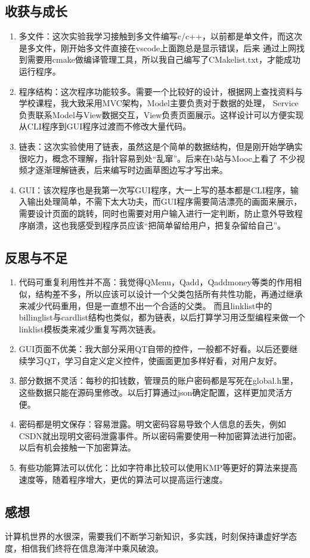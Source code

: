 \documentclass{article}
\begin{document}
        \subsection{收获与成长}
        \begin{enumerate}
            \item 多文件：这次实验我学习接触到多文件编写c/c++，以前都是单文件，而这次是多文件，刚开始多文件直接在vscode上面跑总是显示错误，后来
            通过上网找到需要用cmake做编译管理工具，所以我自己编写了CMakelist.txt，才能成功运行程序。
            \item 程序结构：这次程序功能较多。需要一个比较好的设计，根据网上查找资料与学校课程，我大致采用MVC架构，Model主要负责对于数据的处理，
            Service负责联系Model与View数据交互，View负责页面展示。这样设计可以方便实现从CLI程序到GUI程序过渡而不修改大量代码。
            \item 链表：这次实验使用了链表，虽然这是个简单的数据结构，但是刚开始学确实很吃力，概念不理解，指针容易到处“乱窜”。后来在b站与Mooc上看了
            不少视频才逐渐理解链表，后来编写时边画草图边写才写出来。
            \item GUI：该次程序也是我第一次写GUI程序，大一上写的基本都是CLI程序，输入输出处理简单，不需下太大功夫，而GUI程序需要简洁漂亮的画面来展示，
            需要设计页面的跳转，同时也需要对用户输入进行一定判断，防止意外导致程序崩溃，这也我感受到程序员应该“把简单留给用户，把复杂留给自己”。
        \end{enumerate}
        \subsection{反思与不足}
        \begin{enumerate}
            \item 代码可重复利用性并不高：我觉得QMenu，Qadd，Qaddmoney等类的作用相似，结构差不多，所以应该可以设计一个父类包括所有共性功能，再通过继承来减少代码重用，但是一直想不出一个合适的父类。
            而且linklist中的billinglist与cardlist结构也类似，都为链表，以后打算学习用泛型编程来做一个linklist模板类来减少重复写两次链表。
            \item GUI页面不优美：我大部分采用QT自带的控件，一般都不好看。以后还要继续学习QT，学习自定义定义控件，使画面更加多样好看，对用户友好。
            \item 部分数据不灵活：每秒的扣钱数，管理员的账户密码都是写死在global.h里，这些数据只能在源码里修改。以后打算通过json确定配置，这样更加灵活方便。
            \item 密码都是明文保存：容易泄露。明文密码容易导致个人信息的丢失，例如CSDN就出现明文密码泄露事件。所以密码需要使用一种加密算法进行加密。以后有机会接触一下加密算法。
            \item 有些功能算法可以优化：比如字符串比较可以使用KMP等更好的算法来提高速度等，随着程序增大，更优的算法可以提高运行速度。
        \end{enumerate}
        \subsection{感想}
        计算机世界的水很深，需要我们不断学习新知识，多实践，时刻保持谦虚好学态度，相信我们终将在信息海洋中乘风破浪。
    
\end{document}
